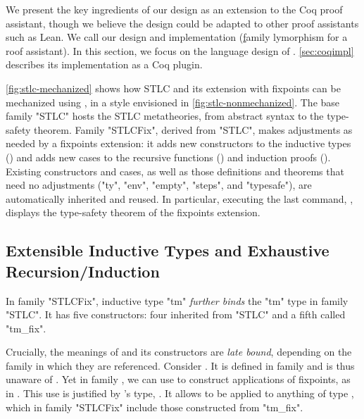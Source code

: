 We present the key ingredients of our design as an extension to the Coq
proof assistant,
though we believe the design could be adapted to other proof assistants such as Lean.
We call our design and implementation \Lang (\underline{f}amily
\underline{}lymorphism for a \underline{}roof assistant).
In this section, we focus on the language design of \Lang.
\cref{sec:coqimpl} describes its implementation as a Coq plugin.



\cref{fig:stlc-mechanized} shows how STLC and its extension with
fixpoints can be mechanized using \Lang, in a style envisioned in
\cref{fig:stlc-nonmechanized}.
The base family "STLC" hosts the STLC metatheories, from abstract syntax
to the type-safety theorem.
Family "STLCFix", derived from "STLC", makes adjustments as needed by a fixpoints extension:
it adds new constructors to the inductive types () and
adds new cases to the recursive functions () and
induction proofs ().
Existing constructors and cases, as well as those definitions and
theorems that need no adjustments ("ty", "env", "empty", "steps", and
"typesafe"), are automatically inherited and reused.
In particular, executing the last command, ,
displays the type-safety theorem of the fixpoints extension.

\subsection{Extensible Inductive Types and Exhaustive Recursion/Induction}


In family "STLCFix", inductive type "tm" \emph{further binds} the "tm" type
in family "STLC". It has five constructors: four inherited from
"STLC" and a fifth called "tm_fix".

Crucially, the meanings of  and its constructors are
\emph{late bound}, depending on the family in which they are referenced.
Consider .
It is defined in family  and is thus unaware of .
Yet in family , we can use  to construct
applications of fixpoints, as in
.
This use is justified by 's type,
.
It allows  to be applied to anything of type ,
which in family "STLCFix" include those constructed from "tm_fix".


